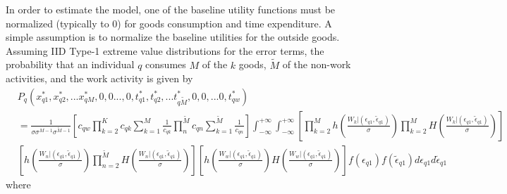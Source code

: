In order to estimate the model, one of the  baseline utility functions must be normalized (typically to 0) for goods consumption and time expenditure. A simple assumption is to normalize the baseline utilities for the outside goods. Assuming IID Type-1 extreme value distributions for the error terms, the probability that an individual $q$ consumes $M$ of the $k$ goods, $\widetilde{M}$ of the non-work activities, and the work activity is given by
\begin{equation}\label{eq:prob1}
\begin{split}
    &P_{q}(x_{q1}^*,x_{q2}^*,...x_{qM}^*,0,0...,0,t_{q1}^*,t_{q2}^*,...t_{q\widetilde{M}}^*,0,0,...0,t_{qw}^*) \\
    &= \frac{1}{\sigma \sigma^{M-1} \sigma^{\widetilde{M}-1}}\left[c_{qw} \prod_{k=2}^K c_{qk} \sum_{k=1}^M \frac{1}{c_{qk}} \prod_{n}^{\widetilde{M}} c_{qn} \sum_{k=1}^{\widetilde{M}} \frac{1}{c_{qn}} \right] \int_{-\infty}^{+\infty} \int_{-\infty}^{+\infty} \left[\prod_{k=2}^M h\left(\frac{W_k|(\epsilon_{q1},\widetilde{\epsilon}_{q1})}{\sigma} \right) \prod_{k=2}^M H\left(\frac{W_k|(\epsilon_{q1},\widetilde{\epsilon}_{q1})}{\sigma} \right) \right] \\
    &\left[ h\left(\frac{W_n|(\epsilon_{q1},\widetilde{\epsilon}_{q1})}{\sigma} \right) \prod_{n=2}^{\widetilde{M}} H\left(\frac{W_n|(\epsilon_{q1},\widetilde{\epsilon}_{q1})}{\sigma} \right) \right]
    \left[ h\left(\frac{W_w|(\epsilon_{q1},\widetilde{\epsilon}_{q1})}{\sigma} \right)  H\left(\frac{W_w|(\epsilon_{q1},\widetilde{\epsilon}_{q1})}{\sigma} \right) \right] f(\epsilon_{q1}) f(\widetilde{\epsilon}_{q1}) d\epsilon_{q1} d\widetilde{\epsilon}_{q1}
\end{split}
\end{equation}
where
